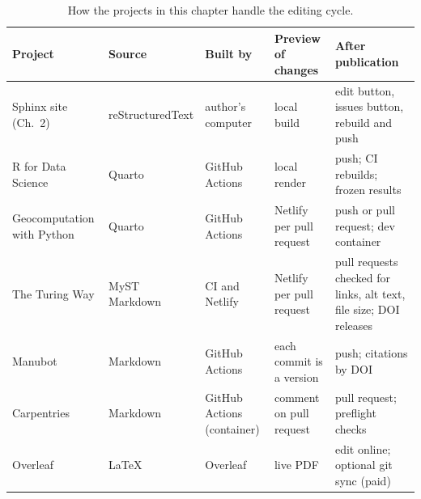 \begin{table}[H]
\centering
\small
\begin{tabularx}{\linewidth}{@{}lXXXX@{}}
\toprule
Project & Source & Built by & Preview of changes & After publication \\
\midrule
Sphinx site (Ch.~2) & reStructuredText & author's computer & local build & edit button, issues button, rebuild and push \\
R for Data Science & Quarto & GitHub Actions & local render & push; CI rebuilds; frozen results \\
Geocomputation with Python & Quarto & GitHub Actions & Netlify per pull request & push or pull request; dev container \\
The Turing Way & MyST Markdown & CI and Netlify & Netlify per pull request & pull requests checked for links, alt text, file size; DOI releases \\
Manubot & Markdown & GitHub Actions & each commit is a version & push; citations by DOI \\
Carpentries & Markdown & GitHub Actions (container) & comment on pull request & pull request; preflight checks \\
Overleaf & LaTeX & Overleaf & live PDF & edit online; optional git sync (paid) \\
\bottomrule
\end{tabularx}
\caption{How the projects in this chapter handle the editing cycle.}
\end{table}
